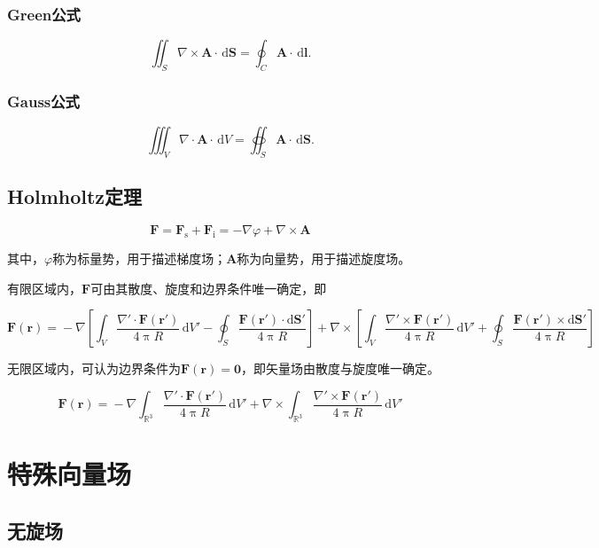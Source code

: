 \documentclass[UTF8,fontset=fandol,zihao=5]{ctexart}
\newcommand{\dd}{\,\mathrm{d}}
\let\bm\boldsymbol
\begin{document}
\subsubsection{Green公式}

\[
\iint_S \nabla \times \bm A \cdot \dd \bm S=\oint_C \bm A \cdot \dd\bm l.
\]

\subsubsection{Gauss公式}

\[
\iiint_V \nabla \cdot \bm A \cdot \dd V = \oiint_S \bm A \cdot \dd\bm S.
\]

\subsection{Holmholtz定理}

\[
\bm F = \bm F_{\mathrm{s}} + \bm F_{\mathrm{i}} = -\nabla \varphi + \nabla \times \bm A
\]

其中，$\varphi$称为标量势，用于描述梯度场；$\bm A$称为向量势，用于描述旋度场。

有限区域内，$\bm F$可由其散度、旋度和边界条件唯一确定，即

\[
\boldsymbol{F}(\boldsymbol{r})
={}
-\nabla\left[
\int_V
\frac{\nabla'\cdot\boldsymbol{F}(\boldsymbol{r}')}
{4\uppi R}\,\mathrm{d}V'
-
\oint_S
\frac{\boldsymbol{F}(\boldsymbol{r}')\cdot\mathrm{d}\boldsymbol{S}'}
{4\uppi R}
\right]
+\nabla\times\left[
\int_V
\frac{\nabla'\times\boldsymbol{F}(\boldsymbol{r}')}
{4\uppi R}\,\mathrm{d}V'
+
\oint_S
\frac{\boldsymbol{F}(\boldsymbol{r}')\times\mathrm{d}\boldsymbol{S}'}
{4\uppi R}
\right]
\]

无限区域内，可认为边界条件为$\bm F(\bm r)=\bm0$，即矢量场由散度与旋度唯一确定。

\[
\boldsymbol{F}(\boldsymbol{r})
={}
-\nabla
\int_{\mathbb{R}^3}
\frac{\nabla'\cdot\boldsymbol{F}(\boldsymbol{r}')}
{4\uppi R}\,\mathrm{d}V'
+\nabla\times
\int_{\mathbb{R}^3}
\frac{\nabla'\times\boldsymbol{F}(\boldsymbol{r}')}
{4\uppi R}\,\mathrm{d}V'
\]

\section{特殊向量场}

\subsection{无旋场}
\end{document}
